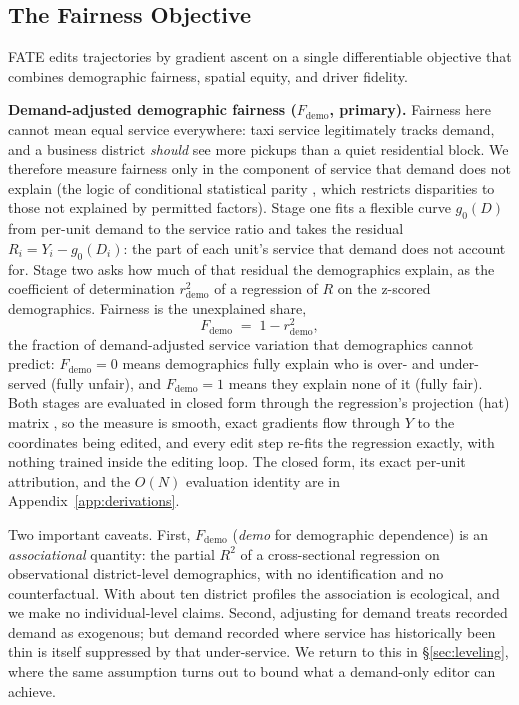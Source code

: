 \subsection{The Fairness Objective}\label{sec:objective}

FATE edits trajectories by gradient ascent on a single differentiable
objective that combines demographic fairness, spatial equity, and driver fidelity.

\textbf{Demand-adjusted demographic fairness ($F_{\mathrm{demo}}$, primary).}
Fairness here cannot mean equal service everywhere: taxi service legitimately
tracks demand, and a business district \emph{should} see more pickups than a
quiet residential block. We therefore measure fairness only in the component of
service that demand does not explain (the logic of conditional statistical
parity \cite{corbettdavies2017}, which restricts disparities to those not
explained by permitted factors). Stage one fits a flexible curve $g_0(D)$
from per-unit demand to the service ratio and takes the residual
$R_i = Y_i - g_0(D_i)$: the part of each unit's service that demand does not
account for. Stage two asks how much of that residual the demographics
explain, as the coefficient of determination $r^{2}_{\mathrm{demo}}$ of a
regression of $R$ on the z-scored demographics. Fairness is the unexplained
share,
\begin{equation}\label{eq:fdemo}
F_{\mathrm{demo}} \;=\; 1 - r^{2}_{\mathrm{demo}} ,
\end{equation}
the fraction of demand-adjusted service variation that demographics cannot
predict: $F_{\mathrm{demo}} = 0$ means demographics fully explain who is
over- and under-served (fully unfair), and $F_{\mathrm{demo}} = 1$ means
they explain none of it (fully fair). Both stages are evaluated in closed
form through the regression's projection (hat) matrix
\cite{hoaglinwelsch1978}, so the measure is smooth, exact gradients flow
through $Y$ to the coordinates being edited, and every edit step re-fits the
regression exactly, with nothing trained inside the editing loop. The closed
form, its exact per-unit attribution, and the $O(N)$ evaluation identity are
in Appendix~\ref{app:derivations}.

Two important caveats. First, $F_{\mathrm{demo}}$ (\emph{demo}
for demographic dependence) is an \emph{associational} quantity: the
partial $R^2$ of a cross-sectional regression on observational
district-level demographics, with no identification and no counterfactual.
With about ten district profiles the association is ecological,
and we make no in\-di\-vid\-ual-level claims. Second, adjusting for demand treats
recorded demand as exogenous; but demand recorded where service has
historically been thin is itself suppressed by that under-service. We return
to this in \S\ref{sec:leveling}, where the same assumption turns out to bound
what a demand-only editor can achieve.

